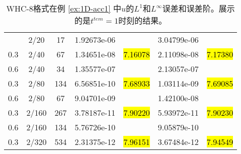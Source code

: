
\begin{table}[htbp]
	\caption{WHC-8格式在例 \ref{ex:1D-acc1} 中$u$的$L^1$和$L^\infty$误差和误差阶。展示的是$t^{tem} = 1$时刻的结果。}
	\label{ta:1D-ex1-WHC8}
	\centering
	\begin{tabular}{ccccccc}
		\toprule
		\titleintable
		\midrule
		0.6 & 2/20  & 17  & 1.92673e-06 &              & 3.04799e-06 &              \\
		0.3 & 2/40  & 67  & 1.34651e-08 & \hl{7.16078} & 2.11098e-08 & \hl{7.17380} \\
		\midrule
		0.6 & 2/40  & 34  & 1.35577e-07 &              & 2.13057e-07 &              \\
		0.3 & 2/80  & 134 & 6.56851e-10 & \hl{7.68933} & 1.03114e-09 & \hl{7.69085} \\
		\midrule
		0.6 & 2/80  & 67  & 9.04701e-09 &              & 1.42100e-08 &              \\
		0.3 & 2/160 & 267 & 3.78187e-11 & \hl{7.90220} & 5.93972e-11 & \hl{7.90230} \\
		\midrule
		0.6 & 2/160 & 134 & 5.76726e-10 &              & 9.05879e-10 &              \\
		0.3 & 2/320 & 534 & 2.31375e-12 & \hl{7.96151} & 3.67484e-12 & \hl{7.94549} \\
		\bottomrule
	\end{tabular}
\end{table}

